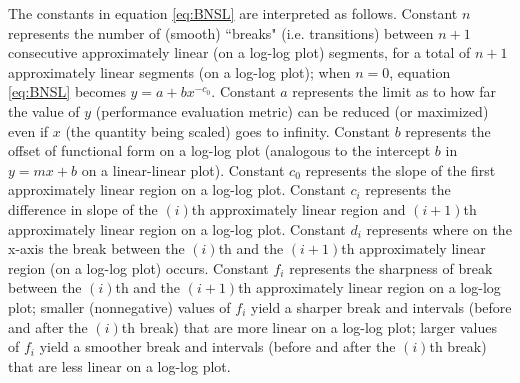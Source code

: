 \documentclass{article} %
\begin{document}
The constants in equation \ref{eq:BNSL} are interpreted as follows. Constant $n$ represents the number of (smooth) ``breaks" (i.e. transitions) between $n+1$ consecutive approximately linear (on a log-log plot) segments, for a total of $n+1$  approximately linear segments (on a log-log plot); 
when $n=0$, equation \ref{eq:BNSL} becomes $y=a+bx^{-c_0}$.
Constant $a$ represents the limit as to how far the value of $y$ (performance evaluation metric) can be reduced (or maximized) even if $x$ (the quantity being scaled) goes to infinity. Constant $b$ represents the offset of functional form on a log-log plot (analogous to the intercept $b$ in $y=mx+b$ on a linear-linear plot). Constant $c_0$ represents the slope of the first approximately linear region on a log-log plot. Constant $c_i$ represents the difference in slope of the $(i)$th approximately linear region and $(i+1)$th approximately linear region on a log-log plot. Constant $d_i$ represents where on the x-axis the break between the $(i)$th and the $(i+1)$th approximately linear region (on a log-log plot) occurs. %
Constant $f_i$ represents the sharpness of break between the $(i)$th and the $(i+1)$th approximately linear region on a log-log plot; smaller (nonnegative) values of $f_i$ yield a sharper break and intervals (before and after the $(i)$th break) that are more linear on a log-log plot; larger values of $f_i$ yield a smoother break and intervals (before and after the $(i)$th break) that are less linear on a log-log plot.
\end{document}
